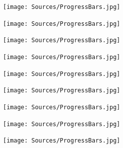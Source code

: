 \begin{figure}[H]
    \begin{subfigure}[l]{23pt}
        \texttt{[image: Sources/ProgressBars.jpg]}
    \end{subfigure}
    \begin{subfigure}[l]{23pt}
        \texttt{[image: Sources/ProgressBars.jpg]}
    \end{subfigure}
    \begin{subfigure}[l]{23pt}
        \texttt{[image: Sources/ProgressBars.jpg]}
    \end{subfigure}
    \begin{subfigure}[l]{23pt}
        \texttt{[image: Sources/ProgressBars.jpg]}
    \end{subfigure}
    \begin{subfigure}[l]{23pt}
        \texttt{[image: Sources/ProgressBars.jpg]}
    \end{subfigure}
    \begin{subfigure}[l]{23pt}
        \texttt{[image: Sources/ProgressBars.jpg]}
    \end{subfigure}
    \begin{subfigure}[l]{23pt}
        \texttt{[image: Sources/ProgressBars.jpg]}
    \end{subfigure}
    \begin{subfigure}[l]{23pt}
        \texttt{[image: Sources/ProgressBars.jpg]}
    \end{subfigure}
    \begin{subfigure}[l]{23pt}
        \texttt{[image: Sources/ProgressBars.jpg]}
    \end{subfigure}
\end{figure}

\vfill

